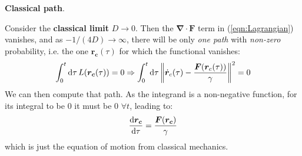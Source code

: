 \documentclass[../template.tex]{subfiles}
\begin{document}
\begin{expl} \textbf{Classical path}.

Consider the \textbf{classical limit} $D \to 0$. Then the $\bm{\nabla}\cdot \bm{F}$ term in (\ref{eqn:Lagrangian}) vanishes, and as $-1/(4D) \to \infty$, there will be only \textit{one path} with \textit{non-zero} probability, i.e. the one $\bm{r_c}(\tau)$ for which the functional vanishes:
\begin{align*}
    \int_0^t \dd{\tau} L(\bm{r_c}(\tau)) = 0 \Rightarrow \int_0^t  \dd{\tau}  \norm{\dot{\bm{r}}_c(\tau) - \frac{\bm{F}(\bm{r}_c(\tau))}{\gamma} }^2 = 0
\end{align*}
We can then compute that path. As the integrand is a non-negative function, for its integral to be $0$ it must be $0$ $\forall t$, leading to:
\begin{align*}
    \dv{\bm{r_c}}{\tau} = \frac{\bm{F}(\bm{r_c})}{\gamma} 
\end{align*}
which is just the equation of motion from classical mechanics.
\end{expl}

\medskip
\end{document}
